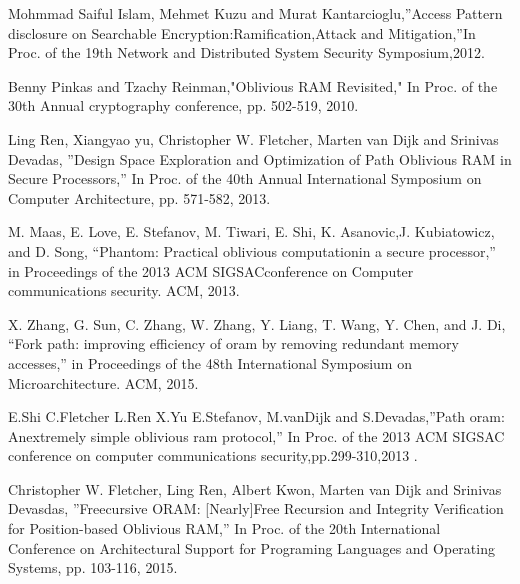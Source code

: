 \documentclass{jarticle}
\begin{document}
\begin{thebibliography}{9}
Mohmmad Saiful Islam, Mehmet Kuzu and Murat Kantarcioglu,”Access Pattern disclosure on Searchable Encryption:Ramification,Attack and Mitigation,”In Proc. of the 19th Network and Distributed System Security Symposium,2012.

Benny Pinkas and Tzachy Reinman,"Oblivious RAM Revisited,"  In Proc. of the 30th Annual cryptography conference, pp.  502-519, 2010.

Ling Ren, Xiangyao yu, Christopher W. Fletcher, Marten van Dijk and Srinivas Devadas, ”Design Space Exploration and Optimization of Path Oblivious RAM in Secure Processors,” In Proc. of the 40th Annual International Symposium on Computer Architecture, pp.  571-582, 2013.

M. Maas, E. Love, E. Stefanov, M. Tiwari, E. Shi, K. Asanovic,J. Kubiatowicz, and D. Song, “Phantom: Practical oblivious computationin a secure processor,” in Proceedings of the 2013 ACM SIGSACconference on Computer  communications security. ACM, 2013.

X. Zhang, G. Sun, C. Zhang, W. Zhang, Y. Liang, T. Wang, Y. Chen, and J. Di, “Fork path: improving efficiency of oram by removing redundant memory accesses,” in Proceedings of the 48th International Symposium on Microarchitecture. ACM, 2015.

E.Shi C.Fletcher L.Ren X.Yu E.Stefanov, M.vanDijk and S.Devadas,”Path oram: Anextremely simple oblivious ram protocol,” In Proc. of the 2013 ACM SIGSAC conference on computer  communications security,pp.299-310,2013 .

Christopher W. Fletcher, Ling Ren, Albert Kwon, Marten van Dijk and Srinivas Devasdas, ”Freecursive ORAM: [Nearly]Free Recursion and Integrity Verification for Position-based Oblivious RAM,” In Proc. of the 20th International Conference on Architectural Support for Programing Languages and Operating Systems, pp. 103-116, 2015. 
\end{thebibliography}





\end{document}
